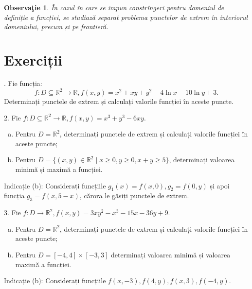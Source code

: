 \documentclass[11pt,a4paper]{article}
\newcommand\seq{\subseteq}
\newcommand\RR{\mathbb{R}}
\theoremstyle{dotless}
\theoremstyle{dotlessdr}
\newtheorem{remark}{Observa\c{t}ie}[section]
\begin{document}
\begin{remark}\label{rk:frontiera}
  În cazul în care se impun constrîngeri pentru domeniul de definiție a funcției,
  se studiază separat problema punctelor de extrem în interiorul domeniului,
  precum și pe frontieră.
\end{remark}




\section{Exerciții}
\label{sec:exc}

\indent{}. Fie funcția:
\[
  f : D \seq \RR^2 \to \RR, f(x, y) = x^2 + xy + y^2 - 4\ln x - 10 \ln y + 3.
\]
Determinați punctele de extrem și calculați valorile funcției în aceste puncte.

\vspace{1cm}

2. Fie $f : D \seq \RR^2 \to \RR, f(x, y) = x^3 + y^3 - 6xy$.
\begin{enumerate}[(a)]
\item Pentru $D = \RR^2$, determinați punctele de extrem și calculați valorile
  funcției în aceste puncte;
\item Pentru $D = \{ (x,y) \in \RR^2 \mid x \geq 0, y \geq 0, x + y \geq 5 \}$,
  determinați valoarea minimă și maximă a funcției.
\end{enumerate}

Indicație (b): Considerați funcțiile $g_1(x) = f(x,0), g_2 = f(0, y)$ și apoi
funcția $g_3 = f(x, 5-x)$, cărora le găsiți punctele de extrem.

\vspace{1cm}

3. Fie $f : D \to \RR^2, f(x, y) = 3xy^2 - x^3 - 15x - 36y + 9$.
\begin{enumerate}[(a)]
\item Pentru $D = \RR^2$, determinați punctele de extrem și calculați valorile
  funcției în aceste puncte;
\item Pentru $D = [-4, 4] \times [-3, 3]$ determinați valoarea minimă și valoarea
  maximă a funcției.
\end{enumerate}

Indicație (b): Considerați funcțiile $f(x, -3), f(4, y), f(x, 3), f(-4, y)$.

\vspace{1cm}
\end{document}
